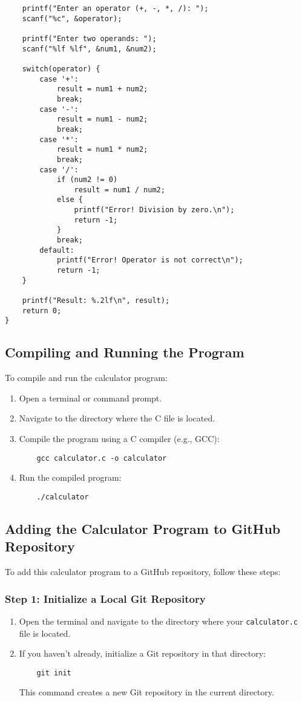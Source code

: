 \documentclass[a4paper,15pt]{article}
\begin{document}
\begin{itemize}[leftmargin=1.5cm]
\begin{verbatim}
    printf("Enter an operator (+, -, *, /): ");
    scanf("%c", &operator);

    printf("Enter two operands: ");
    scanf("%lf %lf", &num1, &num2);

    switch(operator) {
        case '+':
            result = num1 + num2;
            break;
        case '-':
            result = num1 - num2;
            break;
        case '*':
            result = num1 * num2;
            break;
        case '/':
            if (num2 != 0)
                result = num1 / num2;
            else {
                printf("Error! Division by zero.\n");
                return -1;
            }
            break;
        default:
            printf("Error! Operator is not correct\n");
            return -1;
    }

    printf("Result: %.2lf\n", result);
    return 0;
}
\end{verbatim}

\subsection{Compiling and Running the Program}
To compile and run the calculator program:
\begin{enumerate}
    \item Open a terminal or command prompt.
    \item Navigate to the directory where the C file is located.
    \item Compile the program using a C compiler (e.g., GCC):
    \begin{verbatim}
    gcc calculator.c -o calculator
    \end{verbatim}
    \item Run the compiled program:
    \begin{verbatim}
    ./calculator
    \end{verbatim}
\end{enumerate}

\subsection{Adding the Calculator Program to GitHub Repository}
To add this calculator program to a GitHub repository, follow these steps:

\subsubsection{Step 1: Initialize a Local Git Repository}
\begin{enumerate}
    \item Open the terminal and navigate to the directory where your \texttt{calculator.c} file is located.
    \item If you haven't already, initialize a Git repository in that directory:
    \begin{verbatim}
    git init
    \end{verbatim}
    This command creates a new Git repository in the current directory.
\end{enumerate}


\end{itemize}
\end{document}

